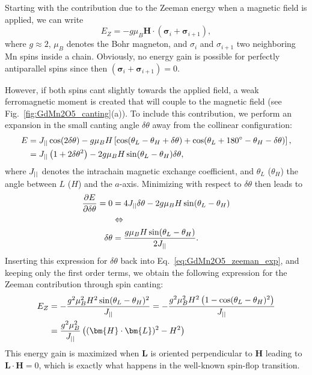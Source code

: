 Starting with the contribution due to the Zeeman energy when a magnetic field is applied, we can write 
\begin{equation}
	E_Z = -g \mu_B \bm{H} \cdot (\pmb{\sigma}_i + \pmb{\sigma}_{i+1})\nonumber,
\end{equation}
where $g \approx 2$, $\mu_B$ denotes the Bohr magneton, and $\sigma_i$ and $\sigma_{i+1}$ two neighboring Mn spins inside a chain. 
Obviously, no energy gain is possible for perfectly antiparallel spins since then $(\pmb{\sigma}_i + \pmb{\sigma}_{i+1})=0$.

However, if both spins cant slightly towards the applied field, a weak ferromagnetic moment is created that will couple to the magnetic field (see Fig.~\ref{fig:GdMn2O5_canting}(a)).
To include this contribution, we perform an expansion in the small canting angle $\delta \theta$ away from the collinear configuration:
\begin{align}
	E &= J_{||} \cos(2\delta \theta) - g \mu_B H \left[\cos(\theta_L - \theta_H + \delta \theta) + \cos(\theta_L + 180^\circ - \theta_H - \delta \theta)\right],\nonumber\\
	&= J_{||} \left( 1+2\delta\theta^2 \right) - 2 g \mu_B H \sin(\theta_L - \theta_H)\delta\theta \label{eq:GdMn2O5_zeeman_exp},
\end{align}
where $J_{||}$ denotes the intrachain magnetic exchange coefficient, and $\theta_L$ ($\theta_H$) the angle between $L$ ($H$) and the $a$-axis.
Minimizing with respect to $\delta \theta$ then leads to
\begin{align}
	\frac{\partial E}{\partial \delta \theta} = 0 &= 4 J_{||} \delta \theta - 2 g \mu_B H \sin(\theta_L - \theta_H) \nonumber\\
	&\Leftrightarrow \nonumber\\
	\delta \theta &= \frac{g\mu_B H \sin(\theta_L - \theta_H)}{2 J_{||}}.\nonumber
\end{align}
Inserting this expression for $\delta \theta$ back into Eq.~\eqref{eq:GdMn2O5_zeeman_exp}, and keeping only the first order terms, we obtain the following expression for the Zeeman contribution through spin canting:
\begin{align}
	\label{eq:GdMn2O5_Zeeman}
	E_Z &= -\frac{g^2\mu_B^2 H^2 \sin(\theta_L - \theta_H)^2}{\Jpar} = -\frac{g^2\mu_B^2 H^2 \left(1 - \cos(\theta_L - \theta_H)^2\right)}{\Jpar}\\
	&=\frac{g^2\mu_B^2}{\Jpar}\left((\bm{H}\cdot\bm{L})^2 - H^2\right)\nonumber
\end{align}
This energy gain is maximized when $\bm{L}$ is oriented perpendicular to $\bm{H}$ leading to $\bm L \cdot \bm H = 0$, which is exactly what happens in the well-known spin-flop transition.
